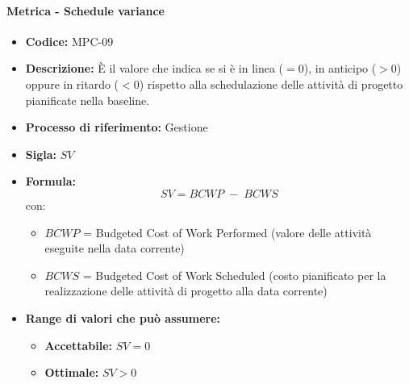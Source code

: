     \paragraph{Metrica - Schedule variance}
    \begin{itemize}
        \item \textbf{Codice:} MPC-09
        \item \textbf{Descrizione:} È il valore che indica se si è in linea ($=0$), in anticipo ($>0$) oppure in ritardo ($<0$) rispetto alla schedulazione delle attività di progetto pianificate nella baseline.
        \item \textbf{Processo di riferimento:} Gestione
        \item \textbf{Sigla:} $SV$
        \item \textbf{Formula:} $$SV = {BCWP \; - \; BCWS}$$
        con:
        \begin{itemize}
            \item $BCWP$ = Budgeted Cost of Work Performed (valore delle attività eseguite nella data corrente)
            \item $BCWS$ = Budgeted Cost of Work Scheduled (costo pianificato per la realizzazione delle attività di progetto alla data corrente)
        \end{itemize}
        \item \textbf{Range di valori che può assumere:}
        \begin{itemize}
            \item \textbf{Accettabile:} $SV = 0$
            \item \textbf{Ottimale:} $SV > 0$
        \end{itemize}
    \end{itemize}


